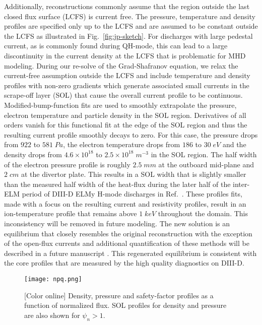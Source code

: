 Additionally, reconstructions commonly assume that the region outside the last
closed flux surface (LCFS) is current free. The pressure, temperature and
density profiles are specified only up to the LCFS and are assumed to be
constant outside the LCFS as illustrated in Fig.~\ref{fig:jp-sketch}.  For
discharges with large pedestal current, as is commonly found during QH-mode,
this can lead to a large discontinuity in the current density at the LCFS that
is problematic for MHD modeling. During our re-solve of the Grad-Shafranov
equation, we relax the current-free assumption outside the LCFS and include
temperature and density profiles with non-zero gradients which generate
associated small currents in the scrape-off layer (SOL) that cause the overall
current profile to be continuous. 
Modified-bump-function fits are used to smoothly extrapolate the pressure,
electron temperature and particle density in the SOL region. Derivatives of all
orders vanish for this functional fit at the edge of the SOL region and thus
the resulting current profile smoothly decays to zero. For this case, the
pressure drops from $922$ to $581\;Pa$, the electron temperature drops from
$186$ to $30\;eV$ and the density drops from $4.6\times10^{18}$ to
$2.5\times10^{18}\;m^{-3}$ in the SOL region. The half width of the electron
pressure profile is roughly $2.5\;mm$ at the outboard mid-plane and $2\;cm$ at
the divertor plate. This results in a SOL width that is slightly smaller than
the measured half width of the heat-flux during the later half of the inter-ELM
period of DIII-D ELMy H-mode discharges in Ref.~\cite{eich13}. These profiles
fits, made with a focus on the resulting current and resistivity profiles,
result in an ion-temperature profile that remains above $1\;keV$ throughout the
domain. This inconsistency will be removed in future modeling. The new solution
is an equilibrium that closely resembles the original reconstruction with the
exception of the open-flux currents and additional quantification of these
methods will be described in a future manuscript \cite{kingSOL}. 
This regenerated equilibrium is consistent with the
core profiles that are measured by the high quality diagnostics on DIII-D.

\begin{figure}
  \centering
  \texttt{[image: npq.png]}
  \vspace{-4mm}
  \caption{[Color online]
  Density, pressure and safety-factor profiles as a function of 
  normalized flux. SOL profiles for density and pressure are also
  shown for $\psi_n>1$.}
  \label{fig:npq}
\end{figure}

